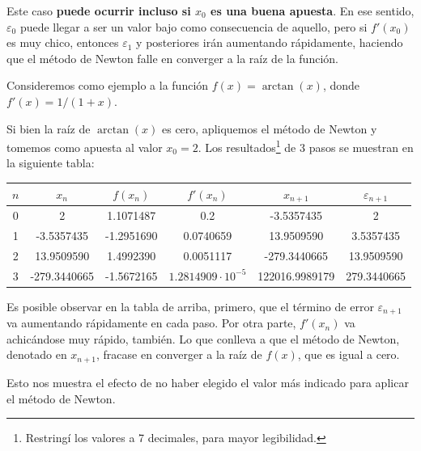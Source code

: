 \documentclass[12pt]{article}
\begin{document}
Este caso \textbf{puede ocurrir incluso si $x_{0}$ es una buena apuesta}. En ese sentido, $\varepsilon_{0}$ puede llegar a ser un valor bajo como consecuencia de aquello, pero si $f'(x_{0})$ es muy chico, entonces $\varepsilon_{1}$ y posteriores irán aumentando rápidamente, haciendo que el método de Newton falle en converger a la raíz de la función.

Consideremos como ejemplo a la función $f(x) = \arctan(x)$, donde $f'(x) = 1/(1+x)$.

Si bien la raíz de $\arctan(x)$ es cero, apliquemos el método de Newton y tomemos como apuesta al valor $x_{0} = 2$. Los resultados\footnote{Restringí los valores a 7 decimales, para mayor legibilidad.} de 3 pasos se muestran en la siguiente tabla:

\begin{table}[hbt!]
\centering

\begin{tabular}{c c c c c c}
\toprule
$n$ & $x_{n}$ & $f(x_{n})$ & $f'(x_{n})$ & $x_{n + 1}$ & $\varepsilon_{n + 1}$ \\
\hline
0 & 2 & 1.1071487 & 0.2 & -3.5357435 & 2 \\
1 & -3.5357435 & -1.2951690 & 0.0740659 & 13.9509590 & 3.5357435 \\
2 & 13.9509590 & 1.4992390 & 0.0051117 & -279.3440665 & 13.9509590 \\
3 & -279.3440665 & -1.5672165 & $1.2814909 \cdot 10^{-5}$ & 122016.9989179 & 279.3440665 \\
\bottomrule
\end{tabular}

\end{table}

Es posible observar en la tabla de arriba, primero, que el término de error $\varepsilon_{n + 1}$ va aumentando rápidamente en cada paso. Por otra parte, $f'(x_{n})$ va achicándose muy rápido, también. Lo que conlleva a que el método de Newton, denotado en $x_{n + 1}$, fracase en converger a la raíz de $f(x)$, que es igual a cero.

Esto nos muestra el efecto de no haber elegido el valor más indicado para aplicar el método de Newton.
\end{document}
